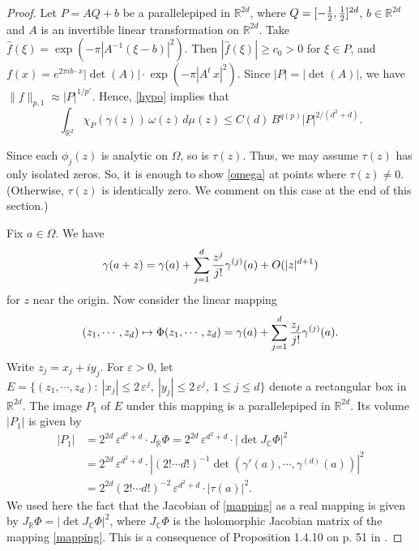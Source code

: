 \documentclass[11 pt]{amsart}
\theoremstyle{plain}
\numberwithin{equation}{section}
\theoremstyle{plain}
\numberwithin{equation}{section}
\theoremstyle{remark}
\begin{document}
\begin{proof}
Let $P = A Q + b$ be a parallelepiped in ${{\mathbb {R}}}^{2d}$, where $Q=[-{1\over 2}, {1\over 2}]^{2d}$,
$b\in {{\mathbb {R}}}^{2d}$ and $A$ is an invertible linear transformation on ${{\mathbb {R}}}^{2d}$.
Take $\widehat{f}(\xi) = \exp (- \pi|A^{-1} (\xi - b)|^2 )$. Then $|\widehat{f}(\xi)| \ge c_0 >0$ for $\xi \in P$, and $f(x) = e^{2\pi i b\cdot x} |\det(A)| \cdot \exp (- \pi |A^t \, x|^2)$. Since $|P| = |\det(A)|$, we have $\| f\|_{p,1} \approx |P|^{1/p'}$. Hence,
\eqref{hypo} implies that
\begin{equation} \label{paraest}
\int_{{{\mathbb {R}}}^2}
 \chi_P (\gamma(z) )\, \omega(z) \, d\mu(z) \le C(d) \,
B^{q(p)} |P|^{2/(d^2+d)} .
\end{equation}

Since each $\phi_j (z)$ is analytic on $\Omega$, so is $\tau(z)$.
Thus, we may assume $\tau(z)$ has only isolated zeros. So, it is enough to show \eqref{omega} at points where $\tau(z) \not= 0$. (Otherwise, $\tau(z)$ is identically zero. We comment on this case at the end of this section.)

Fix $a\in \Omega$. We have
\begin{equation} \label{taylorexp}
\gamma(a+z) = \gamma(a) + \sum_{j=1}^d {z^j\over j!} \gamma^{(j)}(a) + O(|z|^{d+1})
\end{equation}
for $z$ near the origin. Now consider the linear mapping
\begin{equation} \label{mapping}
(z_1, \cdots, z_d) \mapsto \Phi(z_1, \cdots, z_d) = \gamma(a) + \sum_{j=1}^d {z_j\over j!} \gamma^{(j)}(a) .
\end{equation}
Write $z_j = x_j + i y_j$. For ${\varepsilon} >0$, let $E = \{ (z_1, \cdots, z_d):~ |x_j| \le 2 \, {\varepsilon}^j,~  |y_j| \le 2 \, {\varepsilon}^j, ~ 1\le j\le d \}$ denote a rectangular box in ${{\mathbb {R}}}^{2d}$. The image $P_1$ of $E$ under this mapping is a parallelepiped in ${{\mathbb {R}}}^{2d}$. Its volume $|P_1|$
is given by
\begin{align*}
|P_1| &= 2^{2d} \, {\varepsilon}^{d^2+d} \cdot J_{{\mathbb {R}}}\Phi = 2^{2d} \, {\varepsilon}^{d^2+d} \cdot |\det J_{{\mathbb {C}}}\Phi|^2\\
&= 2^{2d} \,{\varepsilon}^{d^2+d} \cdot |(2! \cdots d!)^{-1} \det (\gamma'(a), \cdots, \gamma^{(d)}(a) )|^2 \\
&= 2^{2d} (2! \cdots d!)^{-2}\,
{\varepsilon}^{d^2+d} \cdot |\tau (a)|^2 .
\end{align*}
We used here the fact that the Jacobian of \eqref{mapping} as a real mapping is given by $J_{{\mathbb {R}}} \Phi = |\det J_{{\mathbb {C}}} \Phi|^2$, where $J_{{\mathbb {C}}}\Phi$ is the holomorphic Jacobian matrix of the mapping \eqref{mapping}. This is a consequence of Proposition 1.4.10 on p. 51 in \cite{Kr}.


\end{proof}
\end{document}

